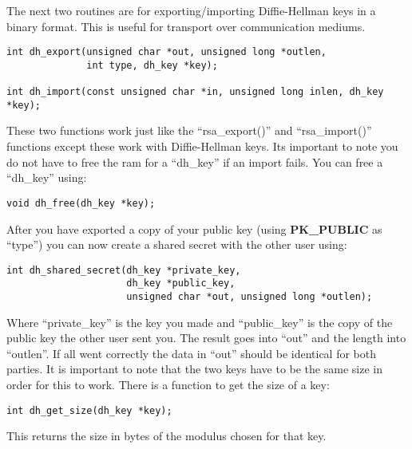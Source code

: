 \documentclass{book}
\begin{document}
The next two routines are for exporting/importing Diffie-Hellman keys in a binary format.  This is useful for transport
over communication mediums.  

 
\begin{verbatim}
int dh_export(unsigned char *out, unsigned long *outlen, 
              int type, dh_key *key);

int dh_import(const unsigned char *in, unsigned long inlen, dh_key *key);
\end{verbatim}

These two functions work just like the ``rsa\_export()'' and ``rsa\_import()'' functions except these work with 
Diffie-Hellman keys. Its important to note you do not have to free the ram for a ``dh\_key'' if an import fails.  You can free a 
``dh\_key'' using:
\begin{verbatim}
void dh_free(dh_key *key);
\end{verbatim}
After you have exported a copy of your public key (using {\bf PK\_PUBLIC} as ``type'') you can now create a shared secret 
with the other user using:
\begin{verbatim}
int dh_shared_secret(dh_key *private_key, 
                     dh_key *public_key, 
                     unsigned char *out, unsigned long *outlen);
\end{verbatim}

Where ``private\_key'' is the key you made and ``public\_key'' is the copy of the public key the other user sent you.  The result goes
into ``out'' and the length into ``outlen''.  If all went correctly the data in ``out'' should be identical for both parties.  It is important to
note that the two keys have to be the same size in order for this to work.  There is a function to get the size of a
key:
\begin{verbatim}
int dh_get_size(dh_key *key);
\end{verbatim}
This returns the size in bytes of the modulus chosen for that key.
\end{document}
